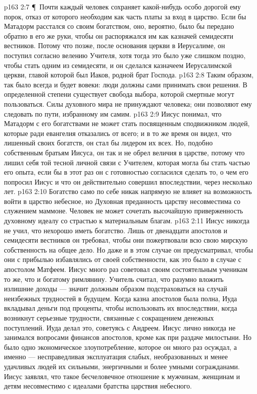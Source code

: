 \vs p163 2:7 \P\ Почти каждый человек сохраняет какой\hyp{}нибудь особо дорогой ему порок, отказ от которого необходим как часть платы за вход в царство. Если бы Матадорм расстался со своим богатством, оно, вероятно, было бы передано обратно в его же руки, чтобы он распоряжался им как казначей семидесяти вестников. Потому что позже, после основания церкви в Иерусалиме, он поступил согласно велению Учителя, хотя тогда это было уже слишком поздно, чтобы стать одним из семидесяти, и он сделался казначеем Иерусалимской церкви, главой которой был Иаков, родной брат Господа.
\vs p163 2:8 Таким образом, так было всегда и будет вовеки: люди должны сами принимать свои решения. В определенной степени существует свобода выбора, которой смертные могут пользоваться. Силы духовного мира не принуждают человека; они позволяют ему следовать по пути, избранному им самим.
\vs p163 2:9 Иисус понимал, что Матадорм с его богатствами не может стать посвященным сподвижником людей, которые ради евангелия отказались от всего; и в то же время он видел, что лишенный своих богатств, он стал бы лидером их всех. Но, подобно собственным братьям Иисуса, он так и не обрел величия в царстве, потому что лишил себя той тесной личной связи с Учителем, которая могла бы стать частью его опыта, если бы в этот раз он с готовностью согласился сделать то, о чем его попросил Иисус и что он действительно совершил впоследствии, через несколько лет.
\vs p163 2:10 Богатство само по себе никак напрямую не влияет на возможность войти в царство небесное, но  Духовная преданность царству несовместима со служением маммоне. Человек не может сочетать высочайшую приверженность духовному идеалу со страстью к материальным благам.
\vs p163 2:11 Иисус никогда не учил, что нехорошо иметь богатство. Лишь от двенадцати апостолов и семидесяти вестников он требовал, чтобы они пожертвовали всю свою мирскую собственность на общее дело. Но даже и в этом случае он предусматривал, чтобы они с прибылью избавлялись от своей собственности, как это было в случае с апостолом Матфеем. Иисус много раз советовал своим состоятельным ученикам то же, что и богатому римлянину. Учитель считал, что разумно вложить излишние доходы --- значит должным образом подстраховаться на случай неизбежных трудностей в будущем. Когда казна апостолов была полна, Иуда вкладывал деньги под проценты, чтобы использовать их впоследствии, когда возникнут серьезные трудности, связанные с сокращением денежных поступлений. Иуда делал это, советуясь с Андреем. Иисус лично никогда не занимался вопросами финансов апостолов, кроме как при раздаче милостыни. Но было одно экономическое злоупотребление, которое он много раз осуждал, а именно --- несправедливая эксплуатация слабых, необразованных и менее удачливых людей их сильными, энергичными и более умными согражданами. Иисус заявлял, что такое бесчеловечное отношение к мужчинам, женщинам и детям несовместимо с идеалами братства царствия небесного.
